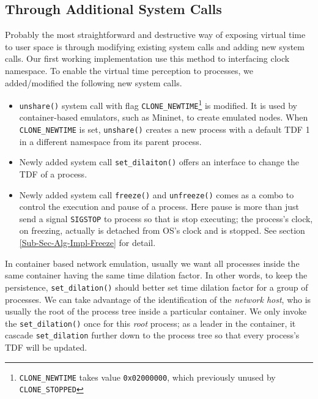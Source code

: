 \documentclass{acm_proc_article-sp}
\begin{document}
\subsection{Through Additional System Calls}
Probably the most straightforward and destructive way of exposing virtual time to user space is through modifying existing system calls and adding new system calls. Our first working implementation use this method to interfacing clock namespace\cite{yan:vts:pads15, yan:vtmininet:sosr15}.
To enable the virtual time perception to processes, we added/modified the following new system calls.
\begin{itemize}

\item \texttt{unshare()} system call with flag \texttt{CLONE\_NEWTIME}\footnote{\texttt{CLONE\_NEWTIME} takes value \texttt{0x02000000}, which previously unused by \texttt{CLONE\_STOPPED}} is modified. It is used by container-based emulators, such as Mininet, to create emulated nodes. When \texttt{CLONE\_NEWTIME} is set, \texttt{unshare()} creates a new process with a default TDF 1 in a different namespace from its parent process.

\item Newly added system call \texttt{set\_dilaiton()} offers an interface to change the TDF of a process. 

\item Newly added system call \texttt{freeze()} and \texttt{unfreeze()} comes as a combo to control the execution and pause of a process. Here pause is more than just send a signal \texttt{SIGSTOP} to process so that is stop executing; the process's clock, on freezing, actually is detached from OS's clock and is stopped. See section \ref{Sub-Sec-Alg-Impl-Freeze} for detail.

\end{itemize}
In container based network emulation, usually we want all processes inside the same container having the same time dilation factor. In other words, to keep the persistence, \texttt{set\_dilation()} should better set time dilation factor for a group of processes. We can take advantage of the identification of the \textit{network host}, who is usually the root of the process tree inside a particular container. We only invoke the \texttt{set\_dilation()} once for this \textit{root} process; as a leader in the container, it cascade \texttt{set\_dilation} further down to the process tree so that every process's TDF will be updated.
\end{document}
